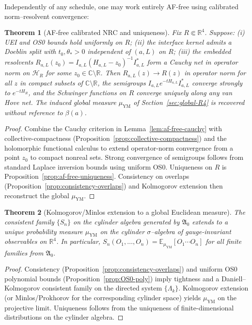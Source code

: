 \documentclass[11pt]{amsart}
\theoremstyle{plain}
\newtheorem{theorem}{Theorem}[section]
\theoremstyle{definition}
\theoremstyle{remark}
\begin{document}
Independently of any schedule, one may work entirely AF-free using calibrated norm--resolvent convergence:

\begin{theorem}[AF-free calibrated NRC and uniqueness]\label{thm:af-free-calibrated}
Fix $R\Subset\mathbb R^4$. Suppose: (i) UEI and OS0 bounds hold uniformly on $R$; (ii) the interface kernel admits a Doeblin split with $t_0,\theta_*>0$ independent of $(a,L)$ on $R$; (iii) the embedded resolvents $R_{a,L}(z_0)=I_{a,L}(H_{a,L}-z_0)^{-1}I_{a,L}^*$ form a Cauchy net in operator norm on $\mathcal H_R$ for some $z_0\in\mathbb C\setminus\mathbb R$. Then $R_{a,L}(z)\to R(z)$ in operator norm for all $z$ in compact subsets of $\mathbb C\setminus\mathbb R$, the semigroups $I_{a,L}e^{-tH_{a,L}}I_{a,L}^*$ converge strongly to $e^{-tH_R}$, and the Schwinger functions on $R$ converge uniquely along any van Hove net. The induced global measure $\mu_{\mathrm{YM}}$ of Section~\ref{sec:global-R4} is recovered without reference to $\beta(a)$.
\end{theorem}
\begin{proof}
Combine the Cauchy criterion in Lemma~\ref{lem:af-free-cauchy} with collective-compactness (Proposition~\ref{prop:collective-compactness}) and the holomorphic functional calculus to extend operator-norm convergence from a point $z_0$ to compact nonreal sets. Strong convergence of semigroups follows from standard Laplace inversion bounds using uniform OS0. Uniqueness on $R$ is Proposition~\ref{prop:af-free-uniqueness}. Consistency on overlaps (Proposition~\ref{prop:consistency-overlaps}) and Kolmogorov extension then reconstruct the global $\mu_{\mathrm{YM}}$.
\end{proof}

\begin{theorem}[Kolmogorov/Minlos extension to a global Euclidean measure]\label{thm:kolmogorov-global}
The consistent family $\{S_n\}$ on the cylinder algebra generated by $\mathfrak A_0$ extends to a unique probability measure $\mu_{\mathrm{YM}}$ on the cylinder $\sigma$--algebra of gauge-invariant observables on $\mathbb R^4$. In particular, $S_n(O_1,\dots,O_n)=\mathbb E_{\mu_{\mathrm{YM}}}[O_1\cdots O_n]$ for all finite families from $\mathfrak A_0$.
\end{theorem}
\begin{proof}
Consistency (Proposition~\ref{prop:consistency-overlaps}) and uniform OS0 polynomial bounds (Proposition~\ref{prop:OS0-poly}) imply tightness and a Daniell--Kolmogorov consistent family on the directed system $\{\Lambda_k\}$. Kolmogorov extension (or Minlos/Prokhorov for the corresponding cylinder space) yields $\mu_{\mathrm{YM}}$ on the projective limit. Uniqueness follows from the uniqueness of finite-dimensional distributions on the cylinder algebra.
\end{proof}
\end{document}

